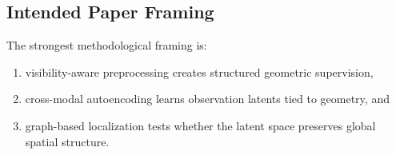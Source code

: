 \subsection{Intended Paper Framing}

The strongest methodological framing is:
\begin{enumerate}[leftmargin=*]
  \item visibility-aware preprocessing creates structured geometric supervision,
  \item cross-modal autoencoding learns observation latents tied to geometry, and
  \item graph-based localization tests whether the latent space preserves global spatial structure.
\end{enumerate}
